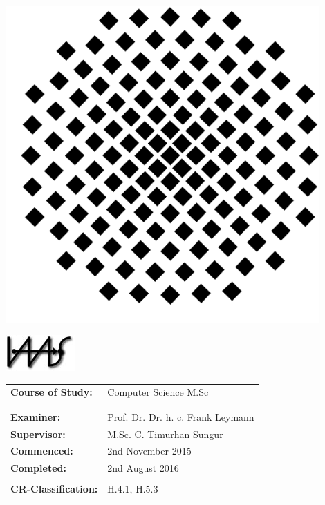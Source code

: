 \documentclass[
               fontsize=12pt, %
               paper=a4,
               twoside, %
               BCOR=3mm, %
               DIV=13,   %
               headinclude=true,
               footinclude=false,
               bibliography=totoc,
               headsepline,
               cleardoublepage=empty,
               parskip=half,
               pointlessnumbers, %
               final   %
               ]{scrbook}
\begin{document}
\begin{titlepage}
\begin{sffamily}
		\begin{center}
			\begin{minipage}{3cm}
				\begin{center}
					\includegraphics[width=0.9\textwidth]{./gfx/unilogo.pdf}
				\end{center}
			\end{minipage}
			\begin{minipage}{3cm}
				\begin{center}
					\includegraphics{./gfx/iaas.jpg}
				\end{center}
			\end{minipage}
		\end{center}
		\vspace{1.0cm}
		\begin{center}
			\begin{tabular}{ll}
				\textbf{Course of Study:} & Computer Science M.Sc\\
				&\\&\\
				\textbf{Examiner:}   & Prof. Dr. Dr. h. c. Frank Leymann\\
				\textbf{Supervisor:}   & M.Sc. C. Timurhan Sungur\\
				
				\textbf{Commenced:} & 2nd November 2015\\
				\textbf{Completed:}  & 2nd August 2016\\
				&\\
				\textbf{CR-Classification:} & H.4.1, H.5.3 \\
				
			\end{tabular}
		\end{center}
	\end{sffamily}
\end{titlepage}
\end{document}
